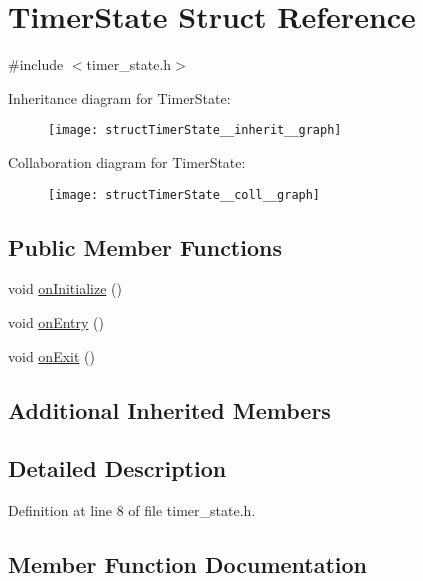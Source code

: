 \hypertarget{structTimerState}{}\section{Timer\+State Struct Reference}
\label{structTimerState}


{\ttfamily \#include $<$timer\+\_\+state.\+h$>$}



Inheritance diagram for Timer\+State\+:
\nopagebreak
\begin{figure}[H]
\begin{center}
\leavevmode
\texttt{[image: structTimerState\_\_inherit\_\_graph]}
\end{center}
\end{figure}


Collaboration diagram for Timer\+State\+:
\nopagebreak
\begin{figure}[H]
\begin{center}
\leavevmode
\texttt{[image: structTimerState\_\_coll\_\_graph]}
\end{center}
\end{figure}
\subsection*{Public Member Functions}
\begin{DoxyCompactItemize}
\item 
void \hyperlink{structTimerState_a5d35a1e08f478a4251221854b79ba020}{on\+Initialize} ()
\item 
void \hyperlink{structTimerState_a470dd79996aa36ad5a57da22d749bec8}{on\+Entry} ()
\item 
void \hyperlink{structTimerState_a2a5f76b47bb83d625f00be8b4daadbf6}{on\+Exit} ()
\end{DoxyCompactItemize}
\subsection*{Additional Inherited Members}


\subsection{Detailed Description}


Definition at line 8 of file timer\+\_\+state.\+h.



\subsection{Member Function Documentation}

